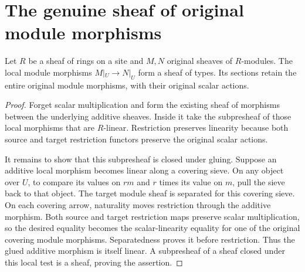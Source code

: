 \section{The genuine sheaf of original module morphisms}

\begin{theorem}
\label{thm:module-hom-original-linearity-descent}
\leanok
Let $R$ be a sheaf of rings on a site and $M,N$ original sheaves of
$R$-modules. The local module morphisms $M|_U\to N|_U$ form a sheaf of
types. Its sections retain the entire original module morphisms, with
their original scalar actions.
\end{theorem}
\begin{proof}
Forget scalar multiplication and form the existing sheaf of morphisms
between the underlying additive sheaves. Inside it take the subpresheaf
of those local morphisms that are $R$-linear. Restriction preserves
linearity because both source and target restriction functors preserve
the original scalar actions.

It remains to show that this subpresheaf is closed under gluing. Suppose
an additive local morphism becomes linear along a covering sieve.
On any object over $U$, to compare its values on $rm$ and $r$ times its
value on $m$, pull the sieve back to that object. The target module
sheaf is separated for this covering sieve. On each covering arrow,
naturality moves restriction through the additive morphism. Both
source and target restriction maps preserve scalar multiplication, so
the desired equality becomes the scalar-linearity equality for one of
the original covering module morphisms. Separatedness proves it before
restriction. Thus the glued additive morphism is itself linear. A
subpresheaf of a sheaf closed under this local test is a sheaf, proving
the assertion.
\end{proof}
